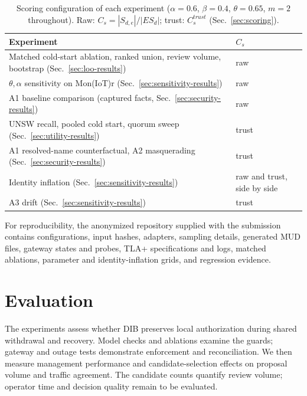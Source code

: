 \documentclass[journal]{IEEEtran}
\theoremstyle{definition}
\begin{document}
\begin{table}[t]
\centering
\caption{Scoring configuration of each experiment ($\alpha=0.6$, $\beta=0.4$, $\theta=0.65$, $m=2$ throughout). Raw: $C_s=|S_{d,e}|/|ES_d|$; trust: $C_s^{trust}$ (Sec.~\ref{sec:scoring}).}
\label{tab:configs}
\scriptsize
\begin{tabular}{@{}p{4.6cm}p{2.5cm}@{}}
\toprule
Experiment & $C_s$ \\
\midrule
Matched cold-start ablation, ranked union, review volume, bootstrap (Sec.~\ref{sec:loo-results}) & raw \\
$\theta,\alpha$ sensitivity on Mon(IoT)r (Sec.~\ref{sec:sensitivity-results}) & raw \\
A1 baseline comparison (captured facts, Sec.~\ref{sec:security-results}) & raw \\
UNSW recall, pooled cold start, quorum sweep (Sec.~\ref{sec:utility-results}) & trust \\
A1 resolved-name counterfactual, A2 masquerading (Sec.~\ref{sec:security-results}) & trust \\
Identity inflation (Sec.~\ref{sec:sensitivity-results}) & raw and trust, side by side \\
A3 drift (Sec.~\ref{sec:sensitivity-results}) & trust \\
\bottomrule
\end{tabular}
\end{table}

For reproducibility, the anonymized repository supplied with the submission contains configurations, input hashes, adapters, sampling details, generated MUD files, gateway states and probes, TLA+ specifications and logs, matched ablations, parameter and identity-inflation grids, and regression evidence. 



\section{Evaluation}
\label{sec:eval}

The experiments assess whether DIB preserves local authorization during shared withdrawal and recovery. Model checks and ablations examine the guards; gateway and outage tests demonstrate enforcement and reconciliation. We then measure management performance and candidate-selection effects on proposal volume and traffic agreement. The candidate counts quantify review volume; operator time and decision quality remain to be evaluated.
\end{document}
